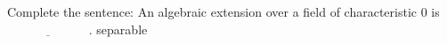 \documentclass[avery5371,grid]{flashcards}
\newcommand{\blank}{$\; \underline{\hspace{1in}} \; $}
\begin{document}
% 
% 
% 
% 
% 
% 





















\begin{flashcard}[Fields]{Complete the sentence: An algebraic extension over a field of characteristic 0 is \blank.}
 separable
\end{flashcard}
\end{document}
